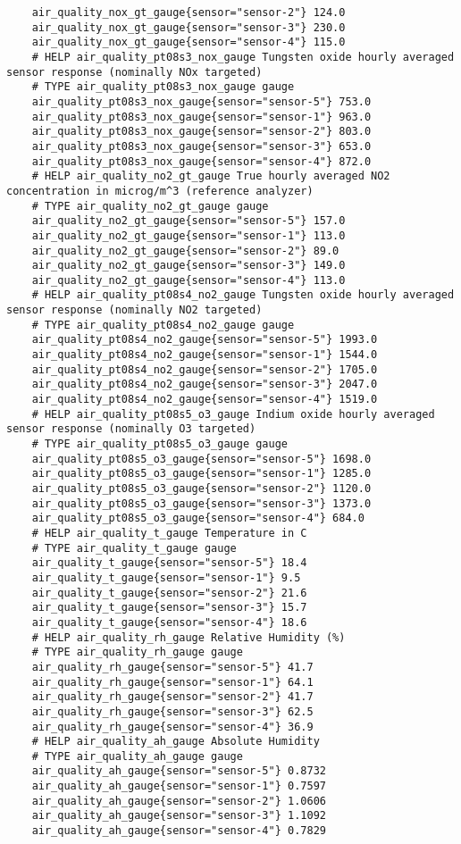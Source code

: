 \begin{verbatim}
    air_quality_nox_gt_gauge{sensor="sensor-2"} 124.0
    air_quality_nox_gt_gauge{sensor="sensor-3"} 230.0
    air_quality_nox_gt_gauge{sensor="sensor-4"} 115.0
    # HELP air_quality_pt08s3_nox_gauge Tungsten oxide hourly averaged sensor response (nominally NOx targeted)
    # TYPE air_quality_pt08s3_nox_gauge gauge
    air_quality_pt08s3_nox_gauge{sensor="sensor-5"} 753.0
    air_quality_pt08s3_nox_gauge{sensor="sensor-1"} 963.0
    air_quality_pt08s3_nox_gauge{sensor="sensor-2"} 803.0
    air_quality_pt08s3_nox_gauge{sensor="sensor-3"} 653.0
    air_quality_pt08s3_nox_gauge{sensor="sensor-4"} 872.0
    # HELP air_quality_no2_gt_gauge True hourly averaged NO2 concentration in microg/m^3 (reference analyzer)
    # TYPE air_quality_no2_gt_gauge gauge
    air_quality_no2_gt_gauge{sensor="sensor-5"} 157.0
    air_quality_no2_gt_gauge{sensor="sensor-1"} 113.0
    air_quality_no2_gt_gauge{sensor="sensor-2"} 89.0
    air_quality_no2_gt_gauge{sensor="sensor-3"} 149.0
    air_quality_no2_gt_gauge{sensor="sensor-4"} 113.0
    # HELP air_quality_pt08s4_no2_gauge Tungsten oxide hourly averaged sensor response (nominally NO2 targeted)
    # TYPE air_quality_pt08s4_no2_gauge gauge
    air_quality_pt08s4_no2_gauge{sensor="sensor-5"} 1993.0
    air_quality_pt08s4_no2_gauge{sensor="sensor-1"} 1544.0
    air_quality_pt08s4_no2_gauge{sensor="sensor-2"} 1705.0
    air_quality_pt08s4_no2_gauge{sensor="sensor-3"} 2047.0
    air_quality_pt08s4_no2_gauge{sensor="sensor-4"} 1519.0
    # HELP air_quality_pt08s5_o3_gauge Indium oxide hourly averaged sensor response (nominally O3 targeted)
    # TYPE air_quality_pt08s5_o3_gauge gauge
    air_quality_pt08s5_o3_gauge{sensor="sensor-5"} 1698.0
    air_quality_pt08s5_o3_gauge{sensor="sensor-1"} 1285.0
    air_quality_pt08s5_o3_gauge{sensor="sensor-2"} 1120.0
    air_quality_pt08s5_o3_gauge{sensor="sensor-3"} 1373.0
    air_quality_pt08s5_o3_gauge{sensor="sensor-4"} 684.0
    # HELP air_quality_t_gauge Temperature in C
    # TYPE air_quality_t_gauge gauge
    air_quality_t_gauge{sensor="sensor-5"} 18.4
    air_quality_t_gauge{sensor="sensor-1"} 9.5
    air_quality_t_gauge{sensor="sensor-2"} 21.6
    air_quality_t_gauge{sensor="sensor-3"} 15.7
    air_quality_t_gauge{sensor="sensor-4"} 18.6
    # HELP air_quality_rh_gauge Relative Humidity (%)
    # TYPE air_quality_rh_gauge gauge
    air_quality_rh_gauge{sensor="sensor-5"} 41.7
    air_quality_rh_gauge{sensor="sensor-1"} 64.1
    air_quality_rh_gauge{sensor="sensor-2"} 41.7
    air_quality_rh_gauge{sensor="sensor-3"} 62.5
    air_quality_rh_gauge{sensor="sensor-4"} 36.9
    # HELP air_quality_ah_gauge Absolute Humidity
    # TYPE air_quality_ah_gauge gauge
    air_quality_ah_gauge{sensor="sensor-5"} 0.8732
    air_quality_ah_gauge{sensor="sensor-1"} 0.7597
    air_quality_ah_gauge{sensor="sensor-2"} 1.0606
    air_quality_ah_gauge{sensor="sensor-3"} 1.1092
    air_quality_ah_gauge{sensor="sensor-4"} 0.7829
\end{verbatim}

